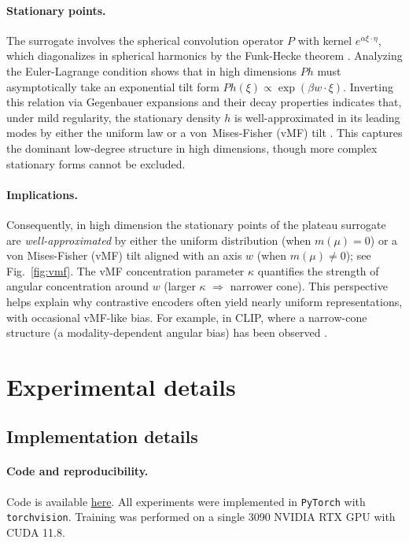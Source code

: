 \documentclass{article}
\begin{document}
\paragraph{Stationary points.}
The surrogate involves the spherical convolution operator $P$ with kernel $e^{\alpha \xi\cdot\eta}$, which diagonalizes in spherical harmonics by the Funk-Hecke theorem \citep{atkinson2012spherical}.  
Analyzing the Euler-Lagrange condition shows that in high dimensions $Ph$ must asymptotically take an exponential tilt form $Ph(\xi)\propto \exp(\beta w\cdot \xi)$.  
Inverting this relation via Gegenbauer expansions and their decay properties \citep{szeg1939orthogonal} indicates that, under mild regularity, the stationary density $h$ is well-approximated in its leading modes by either the uniform law or a von~Mises-Fisher (vMF) tilt \citep{mardia2009directional}. This captures the dominant low-degree structure in high dimensions, though more complex stationary forms cannot be excluded.

\paragraph{Implications.}
Consequently, in high dimension the stationary points of the plateau surrogate are \emph{well-approximated} by either the uniform distribution (when $m(\mu)=0$) or a von Mises-Fisher (vMF) tilt aligned with an axis $w$ (when $m(\mu)\neq 0$); see Fig.~\ref{fig:vmf}. 
The vMF concentration parameter $\kappa$ quantifies the strength of angular concentration around $w$ (larger $\kappa$ $\Rightarrow$ narrower cone). 
This perspective helps explain why contrastive encoders often yield nearly uniform representations, with occasional vMF-like bias. For example, in CLIP, where a narrow-cone structure (a modality-dependent angular bias) has been observed \citep{liang2022mind}.



\section{Experimental details}
\label{app:exp}

\subsection{Implementation details}
\label{app:impl}

\paragraph{Code and reproducibility.}
Code is available \href{https://github.com/rbetser/InfoNCE-induces-Gaussian-distribution}{here}.
All experiments were implemented in \texttt{PyTorch} with \texttt{torchvision}.
Training was performed on a single 3090 NVIDIA RTX GPU with CUDA 11.8.
\end{document}
